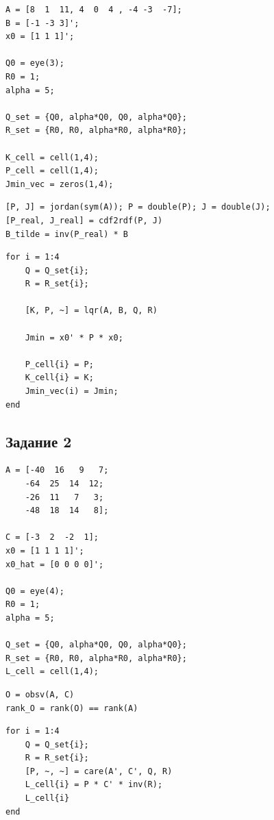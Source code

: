 \documentclass[a4paper,12pt]{article}
\begin{document}
\begin{lstlisting}[caption={Инициализация}]
A = [8  1  11, 4  0  4 , -4 -3  -7];
B = [-1 -3 3]';
x0 = [1 1 1]';

Q0 = eye(3);
R0 = 1;
alpha = 5;

Q_set = {Q0, alpha*Q0, Q0, alpha*Q0};
R_set = {R0, R0, alpha*R0, alpha*R0};
	
K_cell = cell(1,4);
P_cell = cell(1,4);
Jmin_vec = zeros(1,4);
\end{lstlisting}

\begin{lstlisting}[caption={Вещественная Жорданова форма}, label={lst:jordan1}]
[P, J] = jordan(sym(A)); P = double(P); J = double(J);
[P_real, J_real] = cdf2rdf(P, J)
B_tilde = inv(P_real) * B
\end{lstlisting}


\begin{lstlisting}[caption={Расчет \(K\), \(P\), \(J\)}, label={lst:LQR1}]
for i = 1:4
	Q = Q_set{i};
	R = R_set{i};
	
	[K, P, ~] = lqr(A, B, Q, R)
	
	Jmin = x0' * P * x0;
	
	P_cell{i} = P;
	K_cell{i} = K;
	Jmin_vec(i) = Jmin;
end
\end{lstlisting}	
	
	\newpage
\subsection*{Задание 2}

\begin{lstlisting}[caption={Инициализация}]
A = [-40  16   9   7;
	-64  25  14  12;
	-26  11   7   3;
	-48  18  14   8];

C = [-3  2  -2  1];
x0 = [1 1 1 1]';
x0_hat = [0 0 0 0]';

Q0 = eye(4);   
R0 = 1;       
alpha = 5;

Q_set = {Q0, alpha*Q0, Q0, alpha*Q0};
R_set = {R0, R0, alpha*R0, alpha*R0};
L_cell = cell(1,4);
\end{lstlisting}

\begin{lstlisting}[caption={Анализ стабилизируемости}, label={lst:obsv}]
O = obsv(A, C)
rank_O = rank(O) == rank(A)
\end{lstlisting}
	
	
\begin{lstlisting}[caption={Расчет \(L\), \(P\)}, label={lst:LQE2}]
for i = 1:4
	Q = Q_set{i};
	R = R_set{i};
	[P, ~, ~] = care(A', C', Q, R)
	L_cell{i} = P * C' * inv(R);
	L_cell{i}
end
\end{lstlisting}
\end{document}
